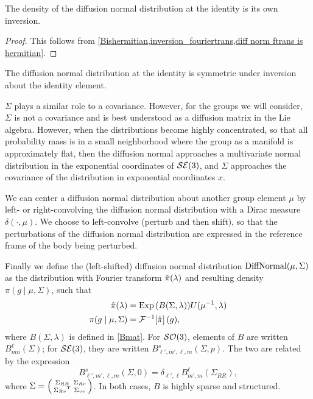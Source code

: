 \documentclass[../../main.tex]{subfiles}
\begin{document}
\begin{refsection}
	\begin{theorem}
		The density of the diffusion normal distribution at the identity is its own inversion.
	\end{theorem}
	\begin{proof}
		This follows from \cref{Bishermitian,inversion_fouriertrans,diff norm ftrans is hermitian}.
	\end{proof}

	\begin{corollary}
		The diffusion normal distribution at the identity is symmetric under inversion about the identity element.
	\end{corollary}

	$\Sigma$ plays a similar role to a covariance.
	However, for the groups we will consider, $\Sigma$ is not a covariance and is best understood as a diffusion matrix in the Lie algebra.
	However, when the distributions become highly concentrated, so that all probability mass is in a small neighborhood where the group as a manifold is approximately flat, then the diffusion normal approaches a multivariate normal distribution in the exponential coordinates of $\mathcal{SE} (3)$, and $\Sigma$ approaches the covariance of the distribution in exponential coordinates $x$.

	We can center a diffusion normal distribution about another group element $\mu$ by left- or right-convolving the diffusion normal distribution with a Dirac measure $\delta(\cdot, \mu)$.
	We choose to left-convolve (perturb and then shift), so that the perturbations of the diffusion normal distribution are expressed in the reference frame of the body being perturbed.

	Finally we define the (left-shifted) diffusion normal distribution $\operatorname{DiffNormal}(\mu, \Sigma)$ as the distribution with Fourier transform $\hat{\pi}(\lambda)$ and resulting density $\pi(g \mid \mu, \Sigma)$, such that
	\begin{align}
		\begin{split}\label{diffnorm}
			\hat{\pi}(\lambda)  & = \operatorname{Exp}\qty(B(\Sigma, \lambda)) U(\mu^{-1}, \lambda) \\
			\pi(g \mid \mu, \Sigma) & = \mathcal{F}^{-1}\qty[\hat{\pi}](g),
		\end{split}
	\end{align}
	where $B(\Sigma, \lambda)$ is defined in \cref{Bmat}.
	For $\mathcal{SO} (3)$, elements of $B$ are written $B^\ell_{mn}(\Sigma)$;
	for $\mathcal{SE} (3)$, they are written $B^s_{\ell',m',\ell,m}(\Sigma, p)$.
	The two are related by the expression
	$$B^s_{\ell',m',\ell,m}(\Sigma, 0) = \delta_{\ell',\ell} B^\ell_{m',m}(\Sigma_{RR}),$$
	where $\Sigma = \smqty(\Sigma_{RR} & \Sigma_{Rv} \\ \trans{\Sigma_{Rv}} & \Sigma_{vv})$.
	In both cases, $B$ is highly sparse and structured.


\end{refsection}
\end{document}

